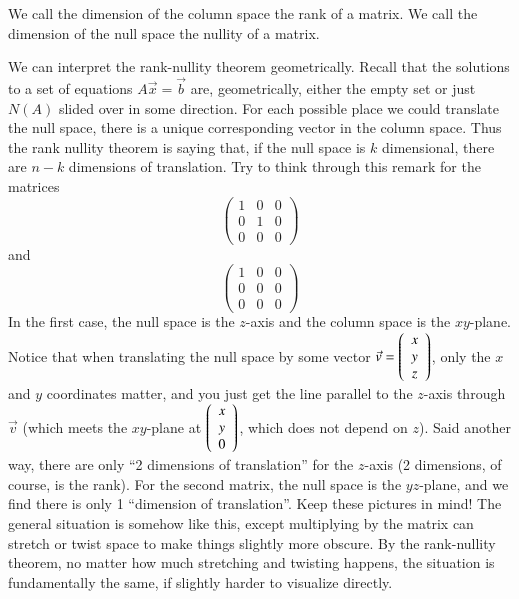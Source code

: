 \begin{Def}
  We call the dimension of the column space the rank of a matrix.
  We call the dimension of the null space the nullity of a matrix.
\end{Def}

\begin{Remark}
  We can interpret the rank-nullity theorem geometrically.
  Recall that the solutions to a set of equations $A\vec{x}=\vec{b}$ are, geometrically, either the empty set or just $N(A)$ slided over in some direction.  
  For each possible place we could translate the null space, there is a unique corresponding vector in the column space.  
  Thus the rank nullity theorem is saying that, if the null space is $k$ dimensional, there are $n-k$ dimensions of translation.
  Try to think through this remark for the matrices
  \[\left(\begin{array}{ccc} 1 & 0 & 0 \\ 0 & 1 & 0 \\ 0 & 0 & 0\end{array}\right)\]
  and
  \[\left(\begin{array}{ccc} 1 & 0 & 0 \\ 0 & 0 & 0 \\ 0 & 0 & 0\end{array}\right)\]
  In the first case, the null space is the $z$-axis and the column space is the $xy$-plane.
  Notice that when translating the null space by some vector $\vec{v} = \left(\begin{array}{c}x\\y\\z\end{array}\right)$, only the $x$ and $y$ coordinates matter, and you just get the line parallel to the $z$-axis through $\vec{v}$ (which meets the $xy$-plane at $\left(\begin{array}{c}x\\y\\0\end{array}\right)$, which does not depend on $z$).  Said another way, there are only ``2 dimensions of translation'' for the $z$-axis (2 dimensions, of course, is the rank).
  For the second matrix, the null space is the $yz$-plane, and we find there is only 1 ``dimension of translation''.  
  Keep these pictures in mind!
  The general situation is somehow like this, except multiplying by the matrix can stretch or twist space to make things slightly more obscure.
  By the rank-nullity theorem, no matter how much stretching and twisting happens, the situation is fundamentally the same, if slightly harder to visualize directly.  
\end{Remark}

